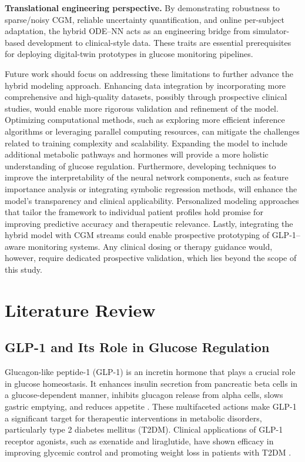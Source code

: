 \documentclass[9pt,shortpaper,twoside,web]{ieeecolor}
\begin{document}
\noindent\textbf{Translational engineering perspective.}
By demonstrating robustness to sparse/noisy CGM, reliable uncertainty quantification, and online per-subject adaptation, the hybrid ODE–NN acts as an engineering bridge from simulator-based development to clinical-style data. These traits are essential prerequisites for deploying digital-twin prototypes in glucose monitoring pipelines.

Future work should focus on addressing these limitations to further advance the hybrid modeling approach. Enhancing data integration by incorporating more comprehensive and high-quality datasets, possibly through prospective clinical studies, would enable more rigorous validation and refinement of the model. Optimizing computational methods, such as exploring more efficient inference algorithms or leveraging parallel computing resources, can mitigate the challenges related to training complexity and scalability. Expanding the model to include additional metabolic pathways and hormones will provide a more holistic understanding of glucose regulation. Furthermore, developing techniques to improve the interpretability of the neural network components, such as feature importance analysis or integrating symbolic regression methods, will enhance the model's transparency and clinical applicability. Personalized modeling approaches that tailor the framework to individual patient profiles hold promise for improving predictive accuracy and therapeutic relevance. Lastly, integrating the hybrid model with CGM streams could enable prospective prototyping of GLP‑1–aware monitoring systems. Any clinical dosing or therapy guidance would, however, require dedicated prospective validation, which lies beyond the scope of this study.


\section{Literature Review}

\subsection{GLP-1 and Its Role in Glucose Regulation}

Glucagon-like peptide-1 (GLP-1) is an incretin hormone that plays a crucial role in glucose homeostasis. It enhances insulin secretion from pancreatic beta cells in a glucose-dependent manner, inhibits glucagon release from alpha cells, slows gastric emptying, and reduces appetite \cite{kaye2024glp1, wang2024supaglutide}. These multifaceted actions make GLP-1 a significant target for therapeutic interventions in metabolic disorders, particularly type 2 diabetes mellitus (T2DM). Clinical applications of GLP-1 receptor agonists, such as exenatide and liraglutide, have shown efficacy in improving glycemic control and promoting weight loss in patients with T2DM \cite{xiang2024dualagonists, morpurgo2024glp1}.
\end{document}
